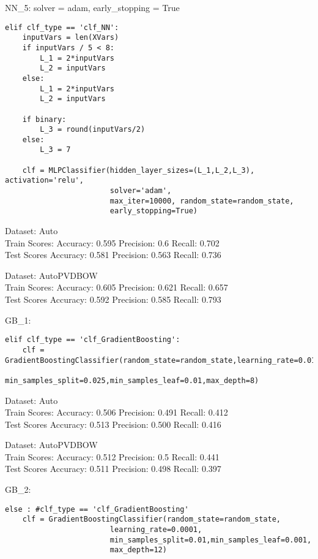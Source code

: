 \documentclass[11pt,preprint, authoryear]{elsarticle}
\numberwithin{equation}{section}
\numberwithin{figure}{section}
\numberwithin{table}{section}
\begin{document}
NN\_5: solver = adam, early\_stopping = True

\begin{verbatim}
elif clf_type == 'clf_NN':
    inputVars = len(XVars)
    if inputVars / 5 < 8:
        L_1 = 2*inputVars
        L_2 = inputVars
    else:
        L_1 = 2*inputVars
        L_2 = inputVars

    if binary:
        L_3 = round(inputVars/2)
    else:
        L_3 = 7

    clf = MLPClassifier(hidden_layer_sizes=(L_1,L_2,L_3), activation='relu', 
                        solver='adam',
                        max_iter=10000, random_state=random_state,
                        early_stopping=True)
\end{verbatim}

Dataset: Auto\\
Train Scores: Accuracy: 0.595 Precision: 0.6 Recall: 0.702\\
Test Scores Accuracy: 0.581 Precision: 0.563 Recall: 0.736

Dataset: AutoPVDBOW\\
Train Scores: Accuracy: 0.605 Precision: 0.621 Recall: 0.657\\
Test Scores Accuracy: 0.592 Precision: 0.585 Recall: 0.793

GB\_1:

\begin{verbatim}
elif clf_type == 'clf_GradientBoosting':  
    clf = GradientBoostingClassifier(random_state=random_state,learning_rate=0.01,
                        min_samples_split=0.025,min_samples_leaf=0.01,max_depth=8)
\end{verbatim}

Dataset: Auto\\
Train Scores: Accuracy: 0.506 Precision: 0.491 Recall: 0.412\\
Test Scores Accuracy: 0.513 Precision: 0.500 Recall: 0.416

Dataset: AutoPVDBOW\\
Train Scores: Accuracy: 0.512 Precision: 0.5 Recall: 0.441\\
Test Scores Accuracy: 0.511 Precision: 0.498 Recall: 0.397

GB\_2:

\begin{verbatim}
else : #clf_type == 'clf_GradientBoosting'
    clf = GradientBoostingClassifier(random_state=random_state,
                        learning_rate=0.0001,
                        min_samples_split=0.01,min_samples_leaf=0.001,
                        max_depth=12)
\end{verbatim}
\end{document}
